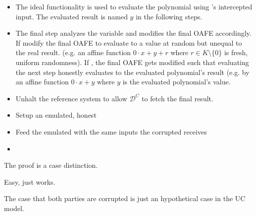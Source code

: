 \begin{itemize}

  \item The ideal functionality is used to evaluate the polynomial using
    \JWpTwo{}'s intercepted input. The evaluated result is named $y$ in the
    following steps.

  \item The final step analyzes the variable  and modifies the
    final OAFE accordingly. If  modify the final OAFE
    to evaluate to a value at random but unequal to the real result. (e.g. an
    affine function $0 \cdot x + y + r$ where $r \in K \setminus \{0\}$ is
    fresh, uniform randomness). If , the final OAFE
    gets modified such that evaluating the next step honestly evaluates to the
    evaluated polynomial's result (e.g. by an affine function $0 \cdot x + y$
    where $y$ is the evaluated polynomial's value.

  \item Unhalt the reference system to allow $\mathcal{D}^C$ to fetch the final
    result.

\end{itemize}


\label{sec:simulator-goliath}

\begin{itemize}

  \item Setup an emulated, honest \JWpOne{}

  \item Feed the emulated \JWpOne{} with the same inputs the corrupted \JWpOne{}
    receives

  \item

\end{itemize}


%
%
\label{sec:proof}

The proof is a case distinction.



Easy, just works.




The case that both parties are corrupted is just an hypothetical case in the UC
model.


